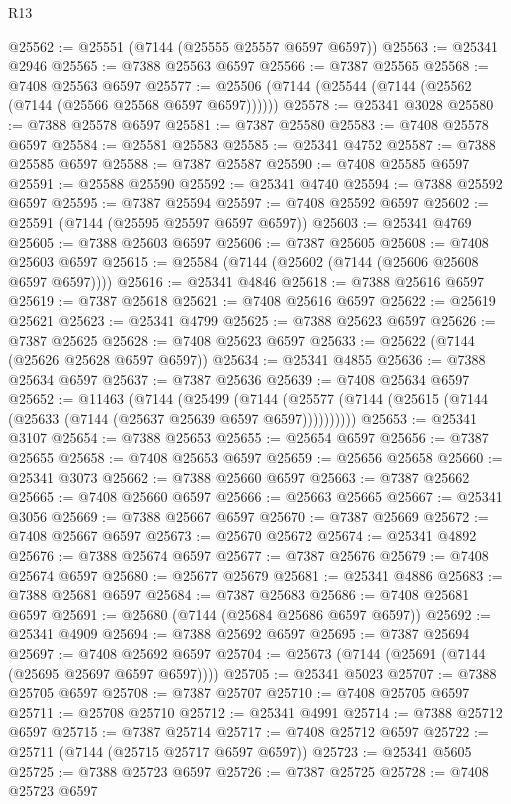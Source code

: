 \begin{lexlean}{R13}
\begin{coremodule}
@25562 := @25551 (@7144 (@25555 @25557 @6597 @6597))
@25563 := @25341 @2946
@25565 := @7388 @25563 @6597
@25566 := @7387 @25565
@25568 := @7408 @25563 @6597
@25577 := @25506 (@7144 (@25544 (@7144 (@25562 (@7144 (@25566 @25568 @6597 @6597))))))
@25578 := @25341 @3028
@25580 := @7388 @25578 @6597
@25581 := @7387 @25580
@25583 := @7408 @25578 @6597
@25584 := @25581 @25583
@25585 := @25341 @4752
@25587 := @7388 @25585 @6597
@25588 := @7387 @25587
@25590 := @7408 @25585 @6597
@25591 := @25588 @25590
@25592 := @25341 @4740
@25594 := @7388 @25592 @6597
@25595 := @7387 @25594
@25597 := @7408 @25592 @6597
@25602 := @25591 (@7144 (@25595 @25597 @6597 @6597))
@25603 := @25341 @4769
@25605 := @7388 @25603 @6597
@25606 := @7387 @25605
@25608 := @7408 @25603 @6597
@25615 := @25584 (@7144 (@25602 (@7144 (@25606 @25608 @6597 @6597))))
@25616 := @25341 @4846
@25618 := @7388 @25616 @6597
@25619 := @7387 @25618
@25621 := @7408 @25616 @6597
@25622 := @25619 @25621
@25623 := @25341 @4799
@25625 := @7388 @25623 @6597
@25626 := @7387 @25625
@25628 := @7408 @25623 @6597
@25633 := @25622 (@7144 (@25626 @25628 @6597 @6597))
@25634 := @25341 @4855
@25636 := @7388 @25634 @6597
@25637 := @7387 @25636
@25639 := @7408 @25634 @6597
@25652 := @11463
    (@7144
      (@25499
        (@7144 (@25577 (@7144 (@25615 (@7144 (@25633 (@7144 (@25637 @25639 @6597 @6597))))))))))
@25653 := @25341 @3107
@25654 := @7388 @25653
@25655 := @25654 @6597
@25656 := @7387 @25655
@25658 := @7408 @25653 @6597
@25659 := @25656 @25658
@25660 := @25341 @3073
@25662 := @7388 @25660 @6597
@25663 := @7387 @25662
@25665 := @7408 @25660 @6597
@25666 := @25663 @25665
@25667 := @25341 @3056
@25669 := @7388 @25667 @6597
@25670 := @7387 @25669
@25672 := @7408 @25667 @6597
@25673 := @25670 @25672
@25674 := @25341 @4892
@25676 := @7388 @25674 @6597
@25677 := @7387 @25676
@25679 := @7408 @25674 @6597
@25680 := @25677 @25679
@25681 := @25341 @4886
@25683 := @7388 @25681 @6597
@25684 := @7387 @25683
@25686 := @7408 @25681 @6597
@25691 := @25680 (@7144 (@25684 @25686 @6597 @6597))
@25692 := @25341 @4909
@25694 := @7388 @25692 @6597
@25695 := @7387 @25694
@25697 := @7408 @25692 @6597
@25704 := @25673 (@7144 (@25691 (@7144 (@25695 @25697 @6597 @6597))))
@25705 := @25341 @5023
@25707 := @7388 @25705 @6597
@25708 := @7387 @25707
@25710 := @7408 @25705 @6597
@25711 := @25708 @25710
@25712 := @25341 @4991
@25714 := @7388 @25712 @6597
@25715 := @7387 @25714
@25717 := @7408 @25712 @6597
@25722 := @25711 (@7144 (@25715 @25717 @6597 @6597))
@25723 := @25341 @5605
@25725 := @7388 @25723 @6597
@25726 := @7387 @25725
@25728 := @7408 @25723 @6597

\end{coremodule}
\end{lexlean}
